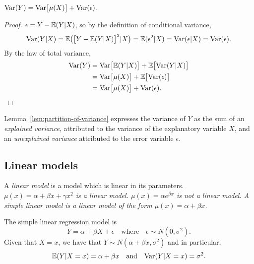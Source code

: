 \begin{lemma}\label{lem:partition-of-variance}
$
\text{Var}(Y) = \text{Var}\big[\mu(X)\big] + \text{Var}(\epsilon).
$
\end{lemma}
\begin{proof}
$\epsilon = Y - \mathbb{E}(Y|X)$, so by the definition of conditional variance,
\[
\text{Var}(Y|X) = \mathbb{E}\big(\big[Y-\mathbb{E}(Y|X)\big]^2|X\big) = \mathbb{E}(\epsilon^2|X) = \text{Var}(\epsilon|X) = \text{Var}(\epsilon).
\]
By the law of total variance,
\begin{align*}
\text{Var}(Y) 
	& = \text{Var}\big[\mathbb{E}(Y|X)\big] + \mathbb{E}\big[\text{Var}(Y|X)\big] \\
	& = \text{Var}\big[\mu(X)\big] + \mathbb{E}\big[\text{Var}(\epsilon)\big] \\
	& = \text{Var}\big[\mu(X)\big] + \text{Var}(\epsilon).
\end{align*}
\end{proof}
Lemma~\ref{lem:partition-of-variance} expresses the variance of $Y$ as the sum of an \emph{explained variance}, attributed to the variance of the explanatory variable $X$, and an \emph{unexplained variance} attributed to the error variable $\epsilon$.

\subsection{Linear models}

\begin{definition}
A \emph{linear model} is a model which is linear in its parameters.
\bit
\it $\mu(x) = \alpha + \beta x + \gamma x^2$ is a linear model.
\it $\mu(x) = \alpha e^{\beta x}$ is not a linear model.
\eit
A \emph{simple linear model} is a linear model of the form $\mu(x) = \alpha + \beta x$.
\end{definition}

The simple linear regression model is
\[
Y = \alpha + \beta X + \epsilon \quad\text{where}\quad \epsilon\sim N(0,\sigma^2).
\]
Given that $X=x$, we have that $Y\sim N(\alpha+\beta x, \sigma^2)$ and in particular,
\[
\mathbb{E}(Y|X=x) = \alpha + \beta x
\quad\text{and}\quad
\text{Var}(Y|X=x) = \sigma^2.
\]

